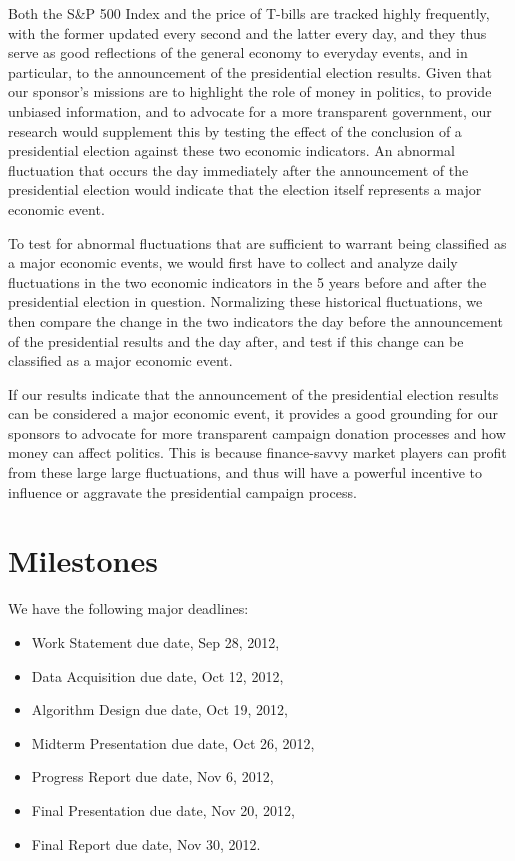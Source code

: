 \documentclass[12pt,letterpaper]{article}
\theoremstyle{definition}
\begin{document}
Both the S\&P 500 Index and the price of T-bills are tracked highly frequently, with the former updated every second and the latter every day, and they thus serve as good reflections of the general economy to everyday events, and in particular, to the announcement of the presidential election results. Given that our sponsor's missions are to highlight the role of money in politics, to provide unbiased information, and to advocate for a more transparent government, our research would supplement this by testing the effect of the conclusion of a presidential election against these two economic indicators. An abnormal fluctuation that occurs the day immediately after the announcement of the presidential election would indicate that the election itself represents a major economic event.

To test for abnormal fluctuations that are sufficient to warrant being classified as a major economic events, we would first have to collect and analyze daily fluctuations in the two economic indicators in the 5 years before and after the presidential election in question. Normalizing these historical fluctuations, we then compare the change in the two indicators the day before the announcement of the presidential results and the day after, and test if this change can be classified as a major economic event. 

If our results indicate that the announcement of the presidential election results can be considered a major economic event, it provides a good grounding for our sponsors to advocate for more transparent campaign donation processes and how money can affect politics. This is because finance-savvy market players can profit from these large large fluctuations, and thus will have a powerful incentive to influence or aggravate the presidential campaign process.

\section{Milestones}
We have the following major deadlines:
\begin{itemize}
    \item Work Statement due date, Sep 28, 2012,
    \item Data Acquisition due date, Oct 12, 2012,
    \item Algorithm Design due date, Oct 19, 2012,
    \item Midterm Presentation due date, Oct 26, 2012,
    \item Progress Report due date, Nov 6, 2012,
    \item Final Presentation due date, Nov 20, 2012,
    \item Final Report due date, Nov 30, 2012.
\end{itemize}
\end{document}
